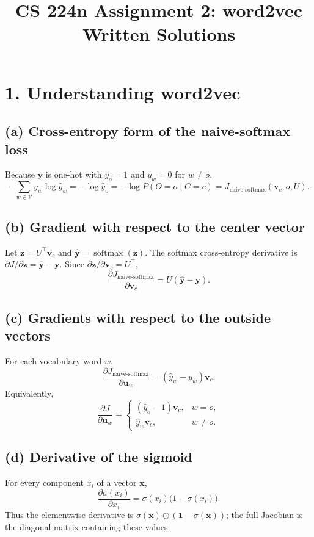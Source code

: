 \documentclass[11pt]{article}
\title{CS 224n Assignment 2: word2vec\\Written Solutions}
\author{}
\date{}
\newcommand{\vocab}{\mathcal{V}}
\newcommand{\softmax}{\operatorname{softmax}}
\newcommand{\sigmoid}{\sigma}
\begin{document}
\maketitle

\section*{1. Understanding word2vec}

\subsection*{(a) Cross-entropy form of the naive-softmax loss}
Because $\bm y$ is one-hot with $y_o=1$ and $y_w=0$ for $w\ne o$,
\[
-\sum_{w\in\vocab} y_w\log \hat y_w
=-\log \hat y_o
=-\log P(O=o\mid C=c)
=J_{\text{naive-softmax}}(\bm v_c,o,U).
\]

\subsection*{(b) Gradient with respect to the center vector}
Let $\bm z=U^\top\bm v_c$ and $\hat{\bm y}=\softmax(\bm z)$. The softmax cross-entropy derivative is
$\partial J/\partial\bm z=\hat{\bm y}-\bm y$. Since $\partial\bm z/\partial\bm v_c=U^\top$,
\[
\boxed{\frac{\partial J_{\text{naive-softmax}}}{\partial \bm v_c}
=U(\hat{\bm y}-\bm y).}
\]

\subsection*{(c) Gradients with respect to the outside vectors}
For each vocabulary word $w$,
\[
\frac{\partial J_{\text{naive-softmax}}}{\partial \bm u_w}
=(\hat y_w-y_w)\bm v_c.
\]
Equivalently,
\[
\boxed{
\frac{\partial J}{\partial \bm u_w}=
\begin{cases}
(\hat y_o-1)\bm v_c, & w=o,\\
\hat y_w\bm v_c, & w\ne o.
\end{cases}}
\]

\subsection*{(d) Derivative of the sigmoid}
For every component $x_i$ of a vector $\bm x$,
\[
\boxed{\frac{\partial\sigmoid(x_i)}{\partial x_i}
=\sigmoid(x_i)\bigl(1-\sigmoid(x_i)\bigr).}
\]
Thus the elementwise derivative is
$\sigmoid(\bm x)\odot(\bm 1-\sigmoid(\bm x))$; the full Jacobian is the diagonal matrix containing these values.
\end{document}
